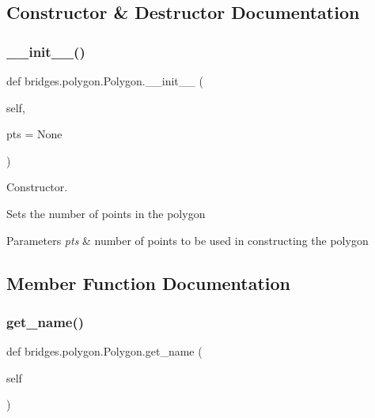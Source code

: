 \subsection{Constructor \& Destructor Documentation}
\mbox{\label{classbridges_1_1polygon_1_1_polygon_a6e2515889df5d8626a32de2d4b36abc1}} 
\subsubsection{\texorpdfstring{\+\_\+\+\_\+init\+\_\+\+\_\+()}{\_\_init\_\_()}}
{\footnotesize\ttfamily def bridges.\+polygon.\+Polygon.\+\_\+\+\_\+init\+\_\+\+\_\+ (\begin{DoxyParamCaption}\item[{}]{self,  }\item[{}]{pts = {\ttfamily None} }\end{DoxyParamCaption})}



Constructor. 

Sets the number of points in the polygon


\begin{DoxyParams}{Parameters}
{\em pts} & number of points to be used in constructing the polygon \\
\hline
\end{DoxyParams}


\subsection{Member Function Documentation}
\mbox{\label{classbridges_1_1polygon_1_1_polygon_afa0d94f62a19b24ad3764bc900718346}} 
\subsubsection{\texorpdfstring{get\+\_\+name()}{get\_name()}}
{\footnotesize\ttfamily def bridges.\+polygon.\+Polygon.\+get\+\_\+name (\begin{DoxyParamCaption}\item[{}]{self }\end{DoxyParamCaption})}



